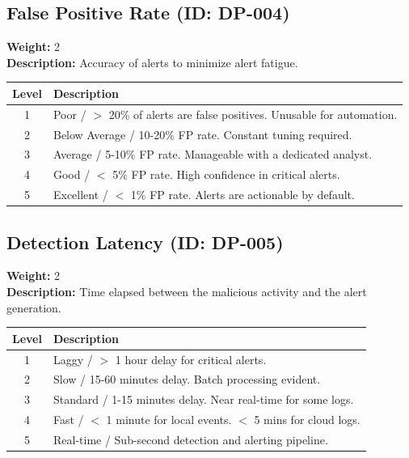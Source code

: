 \documentclass{article}
\begin{document}
\subsection{False Positive Rate (ID: DP-004)}
\textbf{Weight:} 2 \\
\textbf{Description:} Accuracy of alerts to minimize alert fatigue.
\vspace{0.3cm}
\begin{longtable}{|c|p{12cm}|}
\hline
\rowcolor{lightgray} \textbf{Level} & \textbf{Description} \\ \hline
1 & Poor / $>$ 20\% of alerts are false positives. Unusable for automation. \\ \hline
2 & Below Average / 10-20\% FP rate. Constant tuning required. \\ \hline
3 & Average / 5-10\% FP rate. Manageable with a dedicated analyst. \\ \hline
4 & Good / $<$ 5\% FP rate. High confidence in critical alerts. \\ \hline
5 & Excellent / $<$ 1\% FP rate. Alerts are actionable by default. \\ \hline
\end{longtable}
\vspace{0.5cm}
\subsection{Detection Latency (ID: DP-005)}
\textbf{Weight:} 2 \\
\textbf{Description:} Time elapsed between the malicious activity and the alert generation.
\vspace{0.3cm}
\begin{longtable}{|c|p{12cm}|}
\hline
\rowcolor{lightgray} \textbf{Level} & \textbf{Description} \\ \hline
1 & Laggy / $>$ 1 hour delay for critical alerts. \\ \hline
2 & Slow / 15-60 minutes delay. Batch processing evident. \\ \hline
3 & Standard / 1-15 minutes delay. Near real-time for some logs. \\ \hline
4 & Fast / $<$ 1 minute for local events. $<$ 5 mins for cloud logs. \\ \hline
5 & Real-time / Sub-second detection and alerting pipeline. \\ \hline
\end{longtable}
\vspace{0.5cm}
\end{document}
